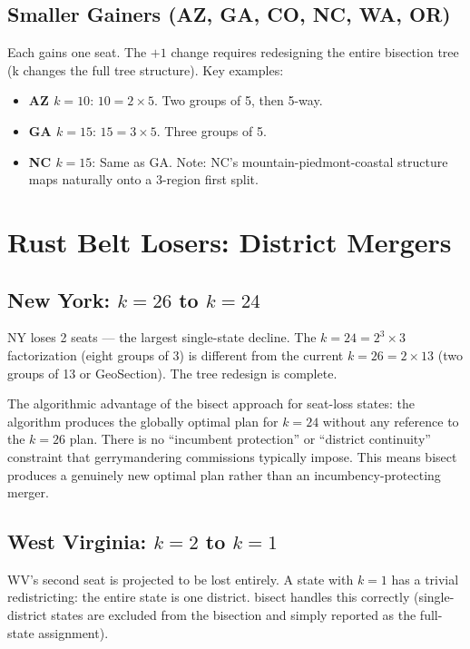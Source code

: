 \subsection{Smaller Gainers (AZ, GA, CO, NC, WA, OR)}

Each gains one seat. The $+1$ change requires redesigning the entire bisection
tree (k changes the full tree structure). Key examples:
\begin{itemize}
  \item \textbf{AZ $k=10$}: $10 = 2\times5$. Two groups of 5, then 5-way.
  \item \textbf{GA $k=15$}: $15 = 3\times5$. Three groups of 5.
  \item \textbf{NC $k=15$}: Same as GA. Note: NC's mountain-piedmont-coastal
    structure maps naturally onto a 3-region first split.
\end{itemize}

\section{Rust Belt Losers: District Mergers}

\subsection{New York: $k = 26$ to $k = 24$}

NY loses 2 seats --- the largest single-state decline. The $k=24 = 2^3\times3$
factorization (eight groups of 3) is different from the current $k=26 = 2\times13$
(two groups of 13 or GeoSection). The tree redesign is complete.

The algorithmic advantage of the bisect approach for seat-loss states: the algorithm
produces the globally optimal plan for $k=24$ without any reference to the $k=26$
plan. There is no ``incumbent protection'' or ``district continuity'' constraint
that gerrymandering commissions typically impose. This means bisect produces a
genuinely new optimal plan rather than an incumbency-protecting merger.

\subsection{West Virginia: $k = 2$ to $k = 1$}

WV's second seat is projected to be lost entirely. A state with $k=1$ has a
trivial redistricting: the entire state is one district. bisect handles this
correctly (single-district states are excluded from the bisection and simply
reported as the full-state assignment).
